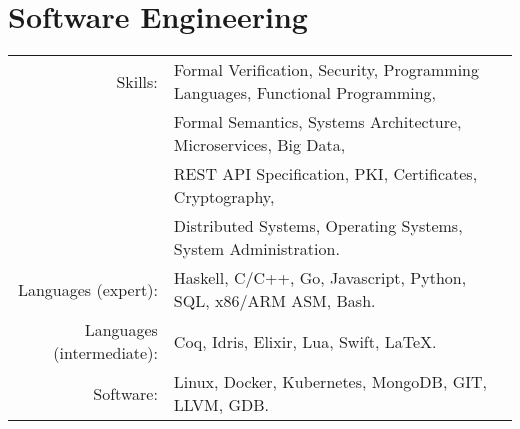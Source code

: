 \documentclass[lettersize,10pt]{article}
\begin{document}
\section{Software Engineering}
\begin{tabular}{rl}
Skills:& Formal Verification, Security, Programming Languages, Functional Programming, \\
	   & Formal Semantics, Systems Architecture, Microservices, Big Data, \\
       & REST API Specification, PKI, Certificates, Cryptography, \\
       & Distributed Systems, Operating Systems, System Administration. \\
Languages (expert):& Haskell, C/C++, Go, Javascript, Python, SQL, x86/ARM ASM, Bash. \\
Languages (intermediate):& Coq, Idris, Elixir, Lua, Swift, \LaTeX. \\
Software:& Linux, Docker, Kubernetes, MongoDB, GIT, LLVM, GDB. \\
\end{tabular}


\end{document}
